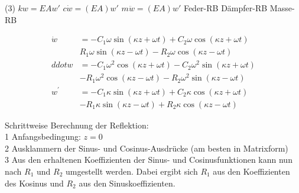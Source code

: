 \begin{tasks} (3)
    \task[] $kw = EAw'$
    \task[] $c\dot w = (EA)w'$
    \task[] $m\ddot w = (EA)w'$
    \task[] Feder-RB
    \task[] Dämpfer-RB
    \task[] Masse-RB
\end{tasks}


\begin{solution}
        \begin{align*}
            \dot{w} &= -C_1 \omega \sin(\kappa z + \omega t) + C_2 \omega \cos(\kappa z + \omega t) \\
                    & R_1 \omega \sin(\kappa z - \omega t) - R_2 \omega \cos(\kappa z - \omega t) \\
            ddot{w} &= - C_1 \omega^2 \cos(\kappa z + \omega t) - C_2 \omega^2 \sin(\kappa z + \omega t) \\
                    & -R_1 \omega^2 \cos(\kappa z - \omega t) - R_2 \omega^2 \sin(\kappa z - \omega t) \\
            w^{'} &= -C_1 \kappa \sin(\kappa z + \omega t) + C_2 \kappa \cos(\kappa z + \omega t) \\
                  & -R_1 \kappa \sin(\kappa z - \omega t) + R_2 \kappa \cos(\kappa z - \omega t)
        \end{align*}

        Schrittweise Berechnung der Reflektion: \\
        1\) Anfangsbedingung: $z=0$ \\
        2\) Ausklammern der Sinus- und Cosinus-Ausdrücke (am besten in Matrixform)\\
        3\) Aus den erhaltenen Koeffizienten der Sinus- und Cosinusfunktionen kann nun nach $R_1$ und $R_2$ umgestellt werden.
            Dabei ergibt sich $R_1$ aus den Koeffizienten des Kosinus und $R_2$ aus den Sinuskoeffizienten.\\


\end{solution}
